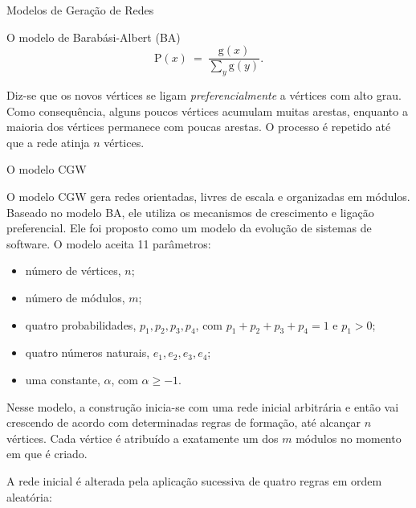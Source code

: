 \begin{section}{Modelos de Geração de Redes}
\begin{subsection}{O modelo de Barabási-Albert (BA)}
	$$
	\mathrm{P}(x) ~=~ \frac{\mathrm{g}(x)}{\sum_y \mathrm{g}(y)}.
	$$
	
	Diz-se que os novos vértices se ligam \emph{preferencialmente} a vértices com alto grau. Como consequência, alguns poucos vértices acumulam muitas arestas, enquanto a maioria dos vértices permanece com poucas arestas. O processo é repetido até que a rede atinja $n$ vértices.
	
	

\end{subsection}

\begin{subsection}{O modelo CGW}

O modelo CGW \cite{Chen2008} gera redes orientadas, livres de escala e organizadas em módulos. Baseado no modelo BA, ele utiliza os mecanismos de crescimento e ligação preferencial. Ele foi proposto como um modelo da evolução de sistemas de software. O modelo aceita 11 parâmetros:

\begin{itemize}
\item número de vértices, $n$;
\item número de módulos, $m$;
\item quatro probabilidades, $p_1, p_2, p_3, p_4$, com $p_1 + p_2 + p_3 + p_4 = 1$ e $p_1 > 0$;
\item quatro números naturais, $e_1, e_2, e_3, e_4$;
\item uma constante, $\alpha$, com $\alpha \ge -1$.
\end{itemize}

Nesse modelo, a construção inicia-se com uma rede inicial arbitrária e então vai crescendo de acordo com determinadas regras de formação, até alcançar $n$ vértices. Cada vértice é atribuído a exatamente um dos $m$ módulos no momento em que é criado.

A rede inicial é alterada pela aplicação sucessiva de quatro regras em ordem aleatória:

\begin{itemize}
	

\end{itemize}
\end{subsection}
\end{section}
